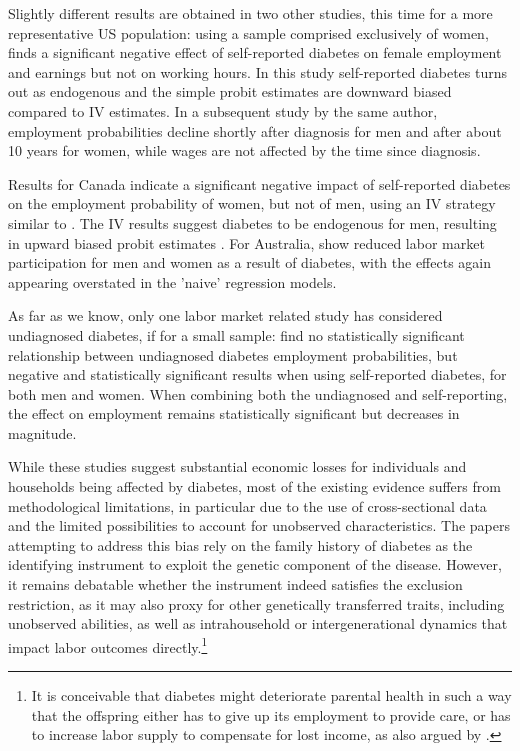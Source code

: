 \documentclass[12pt,english]{article}
\begin{document}
Slightly different results are obtained in two other studies, this time for a more representative US population: using a sample comprised exclusively of women, \textcite{Minor2011} finds a significant negative effect of self-reported diabetes on female employment and earnings but not on working hours. In this study self-reported diabetes turns out as endogenous and the simple probit estimates are downward biased compared to \ac{IV} estimates. In a subsequent study by the same author, employment probabilities decline shortly after diagnosis for men and after about 10 years for women, while wages are not affected by the time since diagnosis.

Results for Canada indicate a significant negative impact of self-reported diabetes on the employment probability of women, but not of men, using an IV strategy similar to \textcite{Brown2005}. The \ac{IV} results suggest diabetes to be  endogenous for men, resulting in upward biased probit estimates \parencite{Latif2009}. For Australia, \parencite{Zhang2009} show  reduced labor market participation for men and women as a result of diabetes, with the effects again appearing overstated in the 'naive' regression models.

As far as we know, only one labor market related study has considered undiagnosed diabetes, if for a small sample: \textcite{Minor2015} find no statistically significant relationship between undiagnosed diabetes employment probabilities, but negative and statistically significant results when using self-reported diabetes, for both men and women. When combining both the undiagnosed and self-reporting, the effect on employment remains statistically significant but decreases in magnitude.

While these studies suggest substantial economic losses for individuals and households being affected by diabetes, most of the existing evidence suffers from methodological limitations, in particular due to the use of cross-sectional data and the limited possibilities to account for unobserved characteristics. The papers attempting to address this bias rely on the family history of diabetes as the identifying instrument to exploit the genetic component of the disease. However, it remains debatable whether the instrument indeed satisfies the exclusion restriction, as it may also proxy for other genetically transferred traits, including unobserved abilities, as well as  intrahousehold or intergenerational dynamics that impact labor outcomes directly.\footnote{It is conceivable that diabetes might deteriorate parental health in such a way that the offspring either has to give up its employment to provide care, or has to increase labor supply to compensate for lost income, as also argued by \textcite{Seuring2015}.} 
\end{document}
